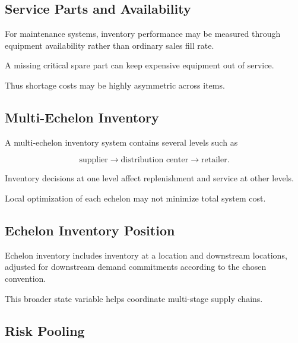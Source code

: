 \subsection{Service Parts and Availability}
\label{subsec:service-parts-availability}

For maintenance systems, inventory performance may be measured through
equipment availability rather than ordinary sales fill rate.

A missing critical spare part can keep expensive equipment out of service.

Thus shortage costs may be highly asymmetric across items.

\subsection{Multi-Echelon Inventory}
\label{subsec:multi-echelon-inventory}

A multi-echelon inventory system contains several levels such as

\[
\boxed{
\text{supplier}
\to
\text{distribution center}
\to
\text{retailer}.
}
\]

Inventory decisions at one level affect replenishment and service at other
levels.

Local optimization of each echelon may not minimize total system cost.

\subsection{Echelon Inventory Position}
\label{subsec:echelon-inventory-position}

Echelon inventory includes inventory at a location and downstream
locations, adjusted for downstream demand commitments according to the
chosen convention.

This broader state variable helps coordinate multi-stage supply chains.

\subsection{Risk Pooling}
\label{subsec:inventory-risk-pooling}


